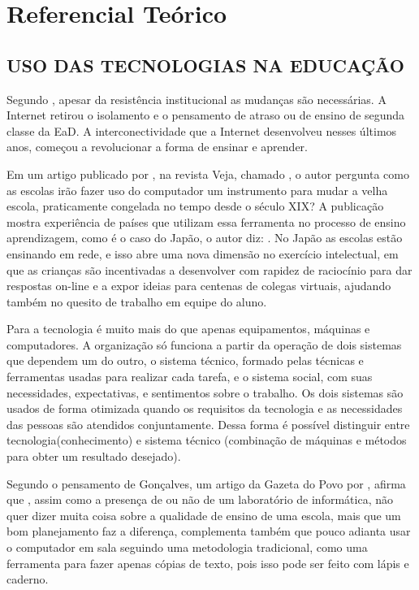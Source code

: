 
\setlength\aftersecskip{0pt}
\chapter[REFERENCIAL TEÓRICO]{Referencial Teórico}
\section{USO DAS TECNOLOGIAS NA EDUCAÇÃO}

Segundo , apesar da resistência institucional as mudanças são necessárias. A Internet retirou o isolamento e o pensamento de atraso ou de ensino de segunda classe da EaD. A interconectividade que a Internet desenvolveu nesses últimos anos, começou a revolucionar a forma de ensinar e aprender.

Em um artigo publicado por , na revista Veja, chamado , o autor pergunta como as escolas irão fazer uso do computador um instrumento para mudar a velha escola, praticamente congelada no tempo desde o século XIX? A publicação mostra experiência de países que utilizam essa ferramenta no processo de ensino aprendizagem, como é o caso do Japão, o autor diz: . No Japão as escolas estão ensinando em rede, e isso abre uma nova dimensão no exercício intelectual, em que as crianças são incentivadas a desenvolver com rapidez de raciocínio para dar respostas on-line e a expor ideias para centenas de colegas virtuais, ajudando também no quesito de trabalho em equipe do aluno.

Para  a tecnologia é muito mais do que apenas equipamentos, máquinas e computadores. A organização só funciona a partir da operação de dois sistemas que dependem um do outro, o sistema técnico, formado pelas técnicas e ferramentas usadas para realizar cada tarefa, e o sistema social, com suas necessidades, expectativas, e sentimentos sobre o trabalho. Os dois sistemas são usados de forma otimizada quando os requisitos da tecnologia e as necessidades das pessoas são atendidos conjuntamente. Dessa forma é possível distinguir entre tecnologia(conhecimento) e sistema técnico (combinação de máquinas e métodos para obter um resultado desejado).

Segundo o pensamento de Gonçalves, um artigo da Gazeta do Povo por , afirma que , assim como a presença de ou não de um laboratório de informática, não quer dizer muita coisa sobre a qualidade de ensino de uma escola, mais que um bom planejamento faz a diferença, complementa também que pouco adianta usar o computador em sala seguindo uma metodologia tradicional, como uma ferramenta para fazer apenas cópias de texto, pois isso pode ser feito com lápis e caderno.

